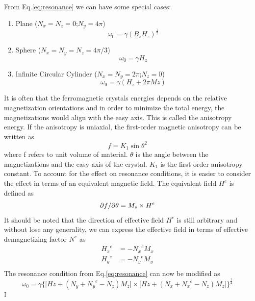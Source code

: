 From Eq.\ref{eq:resonance} we can have some special cases:
\begin{enumerate}
  \item Plane ($N_x = N_z = 0$;$N_y = 4 \pi$)
  \begin{equation}
      \omega_0 = \gamma (B_z H_z)^\frac{1}{2}
  \end{equation}
  \item Sphere ($N_x = N_y = N_z = 4\pi/3$)
  \begin{equation}
      \omega_0 = \gamma H_z
  \end{equation}
  \item Infinite Circular Cylinder ($N_x = N_y = 2\pi$;$N_z = 0 $)
  \begin{equation}
      \omega_0 = \gamma (H_z+2\pi Mz)
  \end{equation}
\end{enumerate}
It is often that the ferromagnetic crystals energies depends on the relative magnetization orientations and in order to minimize the total energy, the magnetizations would align with the easy axis. This is called the anisotropy energy. If the anisotropy is uniaxial, the first-order magnetic anisotropy can be written as 
\begin{equation}
    f = K_1 {\sin{\theta}}^2
\end{equation}
where f refers to unit volume of material. $\theta$ is the angle between the magnetizations and the easy axis of the crystal. $K_1$ is the first-order anisotropy constant. To account for the effect on resonance conditions, it is easier to consider the effect in terms of an equivalent magnetic field. The equivalent field $H^e$ is defined as
\begin{equation}
    \partial f \char`\/ \partial \theta = M_s \times H^e
\end{equation}
It should be noted that the direction of effective field $H^e$ is still arbitrary and without lose any generality, we can express the effective field in terms of effective demagnetizing factor $N^e$ as
\begin{equation}
    \begin{aligned}
        {H_x}^e &= - {N_x}^e M_x \\
        {H_y}^e &= - {N_y}^e M_y \\
    \end{aligned}
\end{equation}
The resonance condition from Eq.\ref{eq:resonance} can now be modified as 
\begin{equation}
    \label{eq:resonanceKu}
    \omega_0 = \gamma \big\{ \big[Hz+(N_y + {N_y}^e - N_z)M_z] \times \big[Hz+(N_x + {N_x}^e - N_z)M_z]          \big\}^\frac{1}{2}
\end{equation}
I
